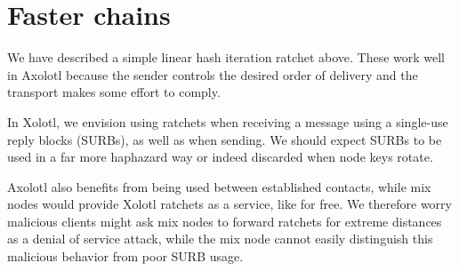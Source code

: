 \documentclass[twoside,letterpaper]{llncs}
\begin{document}
\begin{figure}[b!]%
\end{figure}


\section{Faster chains}

We have described a simple linear hash iteration ratchet above.  
These work well in Axolotl because the sender controls the desired
order of delivery and the transport makes some effort to comply.

In Xolotl, we envision using ratchets when receiving a message 
using a single-use reply blocks (SURBs), as well as when sending.
We should expect SURBs to be used in a far more haphazard way or
indeed discarded when node keys rotate.  

Axolotl also benefits from being used between established contacts,
while mix nodes would provide Xolotl ratchets as a service, like
for free.  We therefore worry malicious clients might ask mix nodes
to forward ratchets for extreme distances as a denial of service
attack, while the mix node cannot easily distinguish this malicious
behavior from poor SURB usage.
\end{document}
